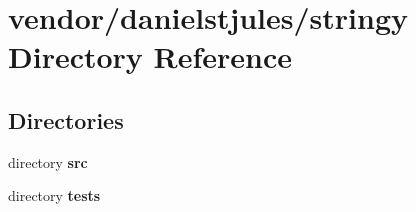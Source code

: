 \section{vendor/danielstjules/stringy Directory Reference}
\label{dir_3ef754ea356ddecdaed57e6bee7c1f3d}
\subsection*{Directories}
\begin{DoxyCompactItemize}
\item 
directory {\bf src}
\item 
directory {\bf tests}
\end{DoxyCompactItemize}
